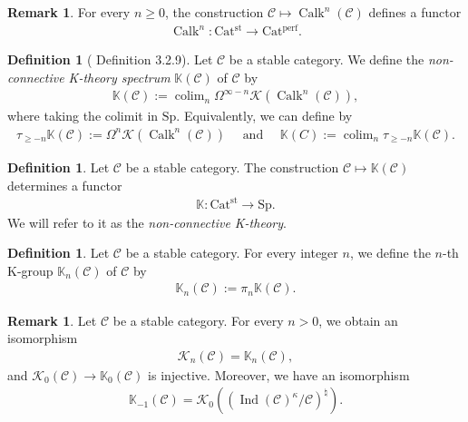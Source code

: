 \documentclass[a4paper,dvipdfmx,11pt,reqno]{amsart}
\DeclareMathOperator*{\colim}{colim}
\newcommand{\C}{\mathcal{C}}
\newcommand{\K}{\mathcal{K}}
\DeclareMathOperator{\Ind}{Ind}
\DeclareMathOperator{\Calk}{Calk}
\newcommand{\Catperf}{\mathrm{Cat^{perf}}}
\newcommand{\Catst}{\mathrm{Cat^{st}}}
\newcommand{\Sp}{\mathrm{Sp}}
\newcommand{\bbK}{\mathbb{K}}
\theoremstyle{definition}
\newtheorem{definition}[theorem]{Definition}
\newtheorem{remark}[theorem]{Remark}
\begin{document}
\begin{remark}
  For every $n \geq 0$, the construction $\C \mapsto \Calk^n(\C)$ defines a functor 
  \begin{align*}
    \Calk^n : \Catst \to \Catperf.
  \end{align*}
\end{remark}

\begin{definition}[\cite{KNP24} Definition 3.2.9] \label{KNP24.def.3.2.9}
  Let $\C$ be a stable category.
  We define the \textit{non-connective K-theory spectrum} $\bbK(\C)$ of $\C$ by
  \begin{align*}
    \bbK(\C) 
    := \colim_{n} \Omega^{\infty-n} \K(\Calk^n(\C)),
  \end{align*}
  where taking the colimit in $\Sp$.
  Equivalently, we can define by 
  \begin{align*}
    \tau_{\geq -n} \bbK(\C) := \Omega^n\K(\Calk^n(\C)) 
    \quad \text{ and } \quad 
    \bbK(C) := \colim_{n} \tau_{\geq -n}\bbK(\C).
  \end{align*}
\end{definition}

\begin{definition}
  Let $\C$ be a stable category.
  The construction $\C \mapsto \bbK(\C)$ determines a functor 
  \begin{align*}
    \bbK : \Catst \to \Sp.
  \end{align*}
  We will refer to it as the \textit{non-connective K-theory}.
\end{definition}

\begin{definition}
  Let $\C$ be a stable category.
  For every integer $n$, we define the $n$-th K-group $\bbK_{n}(\C)$ of $\C$ by
  \begin{align*}
    \bbK_{n}(\C) := \pi_n\bbK(\C).
  \end{align*}
\end{definition}

\begin{remark}
  Let $\C$ be a stable category.
  For every $n > 0$, we obtain an isomorphism
  \begin{align*}
    \K_{n}(\C) = \bbK_{n}(\C),
  \end{align*}
  and $\K_{0}(\C) \to \bbK_{0}(\C)$ is injective.
  Moreover, we have an isomorphism
  \begin{align*}
    \bbK_{-1}(\C) = \K_0((\Ind(\C)^{\kappa}/\C)^{\natural}).
  \end{align*}
\end{remark}
\end{document}
